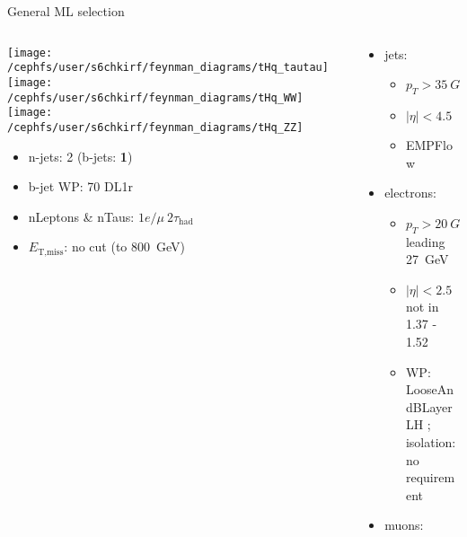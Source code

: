 \begin{frame}{General ML selection}
  \begin{columns}
    \begin{column}{0.5\textwidth}
      \centering \texttt{[image: /cephfs/user/s6chkirf/feynman\_diagrams/tHq\_tautau]}\\
      \texttt{[image: /cephfs/user/s6chkirf/feynman\_diagrams/tHq\_WW]}
      \texttt{[image: /cephfs/user/s6chkirf/feynman\_diagrams/tHq\_ZZ]}
      \begin{itemize}
        \item n-jets: 2 (b-jets: \textbf{1})
        \item b-jet WP: 70 DL1r
        \item nLeptons \& nTaus: \bf{$1e / \mu~2\tau_{\text{had}}$}
        \item $E_{\text{T,miss}}$: no cut (to \SI{800}{GeV})
      \end{itemize}
    \end{column}
    \begin{column}{0.7\textwidth}
      \vspace*{-0.05\textwidth}
      \begin{itemize}
        \footnotesize
        \item jets:
        \vspace*{-0.02\textwidth}
        \begin{itemize}
          \footnotesize
          \item $p_T>\SI{35}{GeV}$
          \item $|\eta|<4.5$
          \item EMPFlow
        \end{itemize}
        \item electrons:
        \vspace*{-0.02\textwidth}
        \begin{itemize}
          \footnotesize
          \item $p_T>\SI{20}{GeV}$ leading \SI{27}{GeV}
          \item $|\eta|<2.5$ not in 1.37 - 1.52
          \item WP: LooseAndBLayerLH ; \\isolation: no requirement
        \end{itemize}
        \item muons:
        \vspace*{-0.02\textwidth}
        \begin{itemize}

\end{itemize}
\end{itemize}
\end{column}
\end{columns}
\end{frame}
